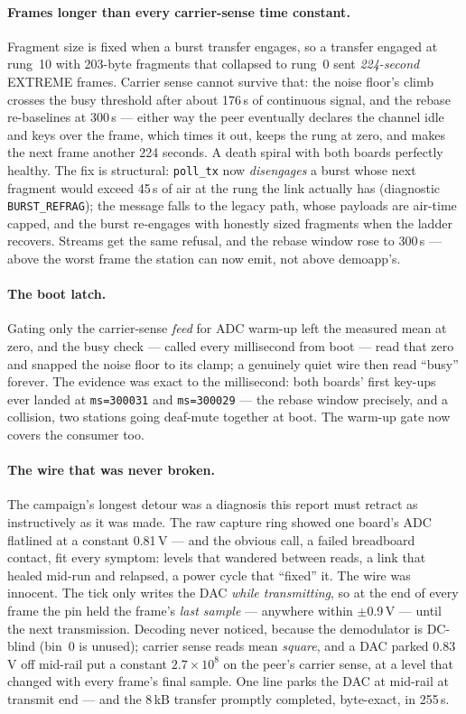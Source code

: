 \paragraph{Frames longer than every carrier-sense time constant.}
Fragment size is fixed when a burst transfer engages, so a transfer
engaged at rung~10 with 203-byte fragments that collapsed to rung~0
sent \emph{224-second} EXTREME frames. Carrier sense cannot survive
that: the noise floor's climb crosses the busy threshold after about
176\,s of continuous signal, and the rebase re-baselines at 300\,s ---
either way the peer eventually declares the channel idle and keys over
the frame, which times it out, keeps the rung at zero, and makes the
next frame another 224 seconds. A death spiral with both boards
perfectly healthy. The fix is structural: \texttt{poll\_tx} now
\emph{disengages} a burst whose next fragment would exceed 45\,s of air
at the rung the link actually has (diagnostic \texttt{BURST\_REFRAG});
the message falls to the legacy path, whose payloads are air-time
capped, and the burst re-engages with honestly sized fragments when the
ladder recovers. Streams get the same refusal, and the rebase window
rose to 300\,s --- above the worst frame the station can now emit, not
above demoapp's.

\paragraph{The boot latch.} Gating only the carrier-sense \emph{feed}
for ADC warm-up left the measured mean at zero, and the busy check ---
called every millisecond from boot --- read that zero and snapped the
noise floor to its clamp; a genuinely quiet wire then read ``busy''
forever. The evidence was exact to the millisecond: both boards' first
key-ups ever landed at \texttt{ms=300031} and \texttt{ms=300029} ---
the rebase window precisely, and a collision, two stations going
deaf-mute together at boot. The warm-up gate now covers the consumer
too.

\paragraph{The wire that was never broken.} The campaign's longest
detour was a diagnosis this report must retract as instructively as it
was made. The raw capture ring showed one board's ADC flatlined at a
constant 0.81\,V --- and the obvious call, a failed breadboard contact,
fit every symptom: levels that wandered between reads, a link that
healed mid-run and relapsed, a power cycle that ``fixed'' it. The wire
was innocent. The tick only writes the DAC \emph{while transmitting},
so at the end of every frame the pin held the frame's \emph{last
sample} --- anywhere within $\pm$0.9\,V --- until the next
transmission. Decoding never noticed, because the demodulator is
DC-blind (bin~0 is unused); carrier sense reads mean \emph{square}, and
a DAC parked 0.83\,V off mid-rail put a constant $2.7\times10^8$ on the
peer's carrier sense, at a level that changed with every frame's final
sample. One line parks the DAC at mid-rail at transmit end --- and the
8\,kB transfer promptly completed, byte-exact, in 255\,s.

